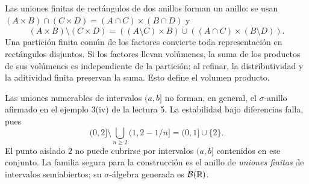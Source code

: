 Las uniones finitas de rectángulos de dos anillos forman un anillo: se usan $ (A\times B)\cap(C\times D)=(A\cap C)\times(B\cap D)$ y
\[(A\times B)\setminus(C\times D)=((A\setminus C)\times B)\mathbin{\dot\cup}((A\cap C)\times(B\setminus D)).\]
Una partición finita común de los factores convierte toda representación en rectángulos disjuntos. Si los factores llevan volúmenes, la suma de los productos de sus volúmenes es independiente de la partición: al refinar, la distributividad y la aditividad finita preservan la suma. Esto define el volumen producto.

\begin{observacion}
Las uniones numerables de intervalos $(a,b]$ no forman, en general, el $\sigma$-anillo afirmado en el ejemplo 3(iv) de la lectura 5. La estabilidad bajo diferencias falla, pues
\[(0,2]\setminus\bigcup_{n\ge2}(1,2-1/n]= (0,1]\cup\{2\}.
\]
El punto aislado $2$ no puede cubrirse por intervalos $(a,b]$ contenidos en ese conjunto. La familia segura para la construcción es el anillo de \emph{uniones finitas} de intervalos semiabiertos; su $\sigma$-álgebra generada es $\mathcal B(\mathbb R)$.
\end{observacion}

